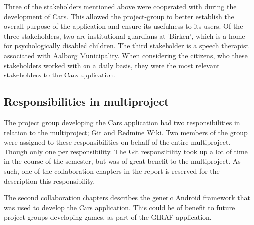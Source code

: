 \documentclass[a4paper,12pt,english]{article}
\begin{document}
Three of the stakeholders mentioned above were cooperated with during the development of Cars.
This allowed the project-group to better establish the overall purpose of the application and ensure its usefulness to its users.
Of the three stakeholders, two are institutional guardians at 'Birken', which is a home for psychologically disabled children.
The third stakeholder is a speech therapist associated with Aalborg Municipality.
When considering the citizens, who these stakeholders worked with on a daily basis, they were the most relevant stakeholders to the Cars application.

\subsection*{Responsibilities in multiproject}
The project group developing the Cars application had two responsibilities in relation to the multiproject; Git and Redmine Wiki.
Two members of the group were assigned to these responsibilities on behalf of the entire multiproject.
Though only one per responsibility.
The Git responsibility took up a lot of time in the course of the semester, but was of great benefit to the multiproject.
As such, one of the collaboration chapters in the report is reserved for the description this responsibility.

The second collaboration chapters describes the generic Android framework that was used to develop the Cars application.
This could be of benefit to future project-groups developing games, as part of the GIRAF application.
\end{document}
